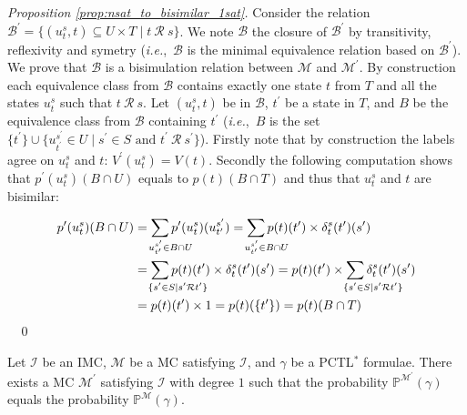 \documentclass{llncs}
\newcommand{\mc}{\textnormal{MC}}
\newcommand{\imc}{\textnormal{IMC}}
\newcommand{\ie} {{\em i.e.},\ }
\newcommand{\pctlStar} {PCTL$^*$}
\newcommand{\Proba}            {\ensuremath{\mathbb{P}}}
\newcommand{\ssum}[2]{\sum\limits_{\mathclap{#1}^{#2}}}%
\newcommand{\ltlExists}{\ensuremath{\Diamond}}
\newcommand{\comment}[2]{{\color{gray}{\small{\underline{#1:} #2}}}}
\newcommand{\anicet}[1]{\marginpar{\comment{Anicet}{#1}}}%
\begin{document}
\begin{proof}[Proposition \ref{prop:nsat_to_bisimilar_1sat}]
	Consider the relation $\mathcal{B}^\prime = \{ (u_t^s, t) \subseteq U \times T \mid t~\mathcal{R}~s \}$.
	We note $\mathcal{B}$ the closure of $\mathcal{B}^\prime$ by transitivity, reflexivity and symetry
	(\ie $\mathcal{B}$ is the minimal equivalence relation based on $\mathcal{B}^\prime$).
	We prove that $\mathcal{B}$ is a bisimulation relation between $\mathcal{M}$ and $\mathcal{M^\prime}$.
	By construction each equivalence class from $\mathcal{B}$
	contains exactly one state $t$ from $T$ and
	all the states $u_t^s$ such that $t~\mathcal{R}~s$.
	Let $(u_t^s, t)$ be in $\mathcal{B}$,
	$t^\prime$ be a state in $T$,
	and $B$ be the equivalence class from $\mathcal{B}$ containing $t^\prime$
	(\ie $B$ is the set $\{ t^\prime \} \cup \{ u_{t^\prime}^{s^\prime} \in U \mid s^{\prime} \in S \text{ and } t^{\prime}~\mathcal{R}~s^{\prime} \}$).
	Firstly note that by construction the labels agree on $u_t^s$ and $t$: $V^\prime(u_t^s) = V(t)$.
	Secondly the following computation shows that $p^\prime(u_t^s)(B \cap U)$ equals to $p(t)(B \cap T)$
	and thus that $u_t^s$ and $t$ are bisimilar:
	\par\noindent
	\begin{align*}
		p^\prime(u_t^s)(B \cap U) &
		=
		\ssum{\hspace*{0.6cm}u_{t^\prime}^{s^\prime} \in B \cap U}{} p^\prime(u_t^s)(u_{t^\prime}^{s^\prime})
		=
		\ssum{\hspace*{0.6cm}u_{t^\prime}^{s^\prime} \in B \cap U}{} p(t)(t^\prime) \times \delta_t^s(t^\prime)(s^\prime) \\
		& 
		=
		\ssum{\hspace*{1cm}\{s^\prime \in S \mid s^\prime \mathcal{R} t^\prime \}}{} p(t)(t^\prime) \times \delta_t^s(t^\prime)(s^\prime)
		=
		p(t)(t^\prime) \times \ssum{\hspace*{1cm}\{s^\prime \in S \mid s^\prime \mathcal{R} t^\prime \}}{} \delta_t^s(t^\prime)(s^\prime) \\
		&
		= 		
		p(t)(t^\prime) \times 1	
		=
		p(t)(\{t^\prime\}) 
		=
		p(t)(B \cap T)
	\end{align*}
	~
	\qed
\end{proof}

\begin{corollary}\label{lem:1sat_same_proba}
	Let $\mathcal{I}$ be an \imc,
	$\mathcal{M}$ be a {\mc} satisfying $\mathcal{I}$, and
	$\gamma$ be a {\pctlStar} formulae.
	There exists a {\mc} $\mathcal{M^\prime}$ satisfying $\mathcal{I}$ with degree $1$
	such that the probability $\Proba^{\mathcal{M}^\prime}(\gamma)$ equals the probability $\Proba^{\mathcal{M}}(\gamma)$.
\end{corollary}
\end{document}
